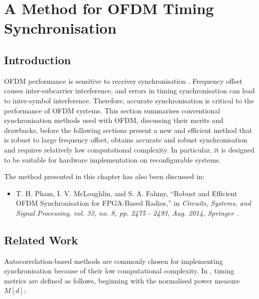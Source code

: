 \chapter{A Method for OFDM Timing Synchronisation}
\label{chap:Synchronisation}

\section{Introduction}
OFDM performance is sensitive to receiver synchronisation \cite{Hanzo2006}. 
Frequency offset causes inter-subcarrier interference, and errors in timing synchronisation can lead to inter-symbol interference. 
Therefore, accurate synchronisation is critical to the performance of OFDM systems.  
This section summarises conventional synchronisation methods used with OFDM, discussing their merits and drawbacks, before the following sections present a new and efficient method that is robust to large frequency offset, obtains accurate  and robust synchronisation and requires relatively low computational complexity. In particular, it is designed to be suitable for hardware implementation on reconfigurable systems. 

The method presented in this chapter has also been discussed in:
\begin{itemize}
\item T. H. Pham, I. V. McLoughlin, and S. A. Fahmy, ``Robust and Efficient OFDM Synchronisation for FPGA-Based Radios,'' in \textit{Circuits, Systems, and Signal Processing, vol. 33, no. 8, pp. 2475 - 2493, Aug. 2014, Springer}~\cite{Pham2014}.
\end{itemize}

\section{Related Work}
Autocorrelation-based methods are commonly chosen for implementing synchronisation because of their low computational complexity. In \cite{Schmidl1997}, timing metrics are defined as follows, beginning with the normalised power measure $M[d]$:

